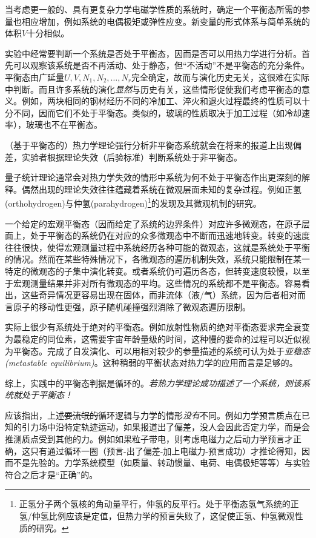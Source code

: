 当考虑更一般的、具有更复杂力学电磁学性质的系统时，确定一个平衡态所需的参量也相应增加，例如系统的电偶极矩或弹性应变。新变量的形式体系与简单系统的体积$V$十分相似。

实验中经常要判断一个系统是否处于平衡态，因而是否可以用热力学进行分析。首先可以观察该系统是否不再活动、处于静态，但“不活动”不是平衡态的充分条件。平衡态由广延量$U, V, N_1, N_2, \dots, N_r$完全确定，故而与演化历史无关，这很难在实际中判断。而且许多系统的演化{\it 显然}与历史有关，这些情形促使我们考虑平衡态的意义。例如，两块相同的钢材经历不同的冷加工、淬火和退火过程最终的性质可以十分不同，因而它们不处于平衡态。类似的，玻璃的性质取决于加工过程（如冷却速率），玻璃也不在平衡态。

（基于平衡态的）热力学理论强行分析非平衡态系统就会在将来的报道上出现偏差，实验者根据理论失效（后验标准）判断系统处于非平衡态。

量子统计理论通常会对热力学失效的情形中系统为何不处于平衡态作出更深刻的解释。偶然出现的理论失效往往蕴藏着系统在微观层面未知的复杂过程。例如正氢(orthohydrogen)与仲氢(parahydrogen)\footnote{正氢分子两个氢核的角动量平行，仲氢的反平行。处于平衡态氢气系统的正氢/仲氢比例应该是定值，但热力学的预言失败了，这促使正氢、仲氢微观性质的研究。}的发现及其微观机制的研究。

一个给定的宏观平衡态（因而给定了系统的边界条件）对应许多微观态，在原子层面上，处于平衡态的系统仍在对应的众多微观态中不断而迅速地转变。转变的速度往往很快，使得宏观测量过程中系统经历各种可能的微观态，这就是系统处于平衡的情况。然而在某些特殊情况下，各微观态的遍历机制失效，系统只能限制在某一特定的微观态的子集中演化转变。或者系统仍可遍历各态，但转变速度较慢，以至于宏观测量结果并非对所有微观态的平均。这些情况的系统都不是平衡态。容易看出，这些奇异情况更容易出现在固体，而非流体（液/气）系统，因为后者相对而言原子的移动性更强，原子随机碰撞强烈消除了微观态遍历限制。

实际上很少有系统处于绝对的平衡态。例如放射性物质的绝对平衡态要求完全衰变为最稳定的同位素，这需要宇宙年龄量级的时间，这种慢的要命的过程可以近似视为平衡态。完成了自发演化、可以用相对较少的参量描述的系统可认为处于{\it 亚稳态 (metastable equilibrium)}。这种稍弱的平衡状态对热力学的应用而言是足够的。

综上，实践中的平衡态判据是循环的。{\it 若热力学理论成功描述了一个系统，则该系统就处于平衡态！}

应该指出，上述\sout{耍流氓的}循环逻辑与力学的情形{\it 没有}不同。例如力学预言质点在已知的引力场中沿特定轨迹运动，如果报道出了偏差，没人会因此否定力学，而是会推测质点受到其他的力。例如如果粒子带电，则考虑电磁力之后动力学预言才正确，这只有通过循环一圈（预言-出了偏差-加上电磁力-预言成功）才推论得知，因而不是先验的。力学系统模型（如质量、转动惯量、电荷、电偶极矩等等）与实验符合之后才是“正确”的。

